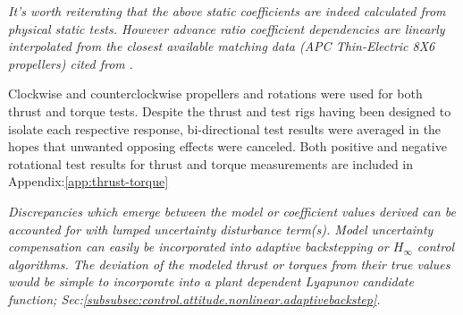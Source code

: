 \par
{\color{Gray}\emph{It's worth reiterating that the above static coefficients are indeed calculated from physical static tests. However advance ratio coefficient dependencies are linearly interpolated from the closest available matching data (APC Thin-Electric 8X6 propellers) cited from \cite{UIUC}}.}
\par
Clockwise and counterclockwise propellers and rotations were used for both thrust and torque tests. Despite the thrust and test rigs having been designed to isolate each respective response, bi-directional test results were averaged in the hopes that unwanted opposing effects were canceled. Both positive and negative rotational test results for thrust and torque measurements are included in Appendix:\ref{app:thrust-torque}
\par
{\color{Gray}\emph{Discrepancies which emerge between the model or coefficient values derived can be accounted for with lumped uncertainty disturbance term(s). Model uncertainty compensation can easily be incorporated into adaptive backstepping or $H_\infty$ control algorithms. The deviation of the modeled thrust or torques from their true values would be simple to incorporate into a plant dependent Lyapunov candidate function; Sec:\ref{subsubsec:control.attitude.nonlinear.adaptivebackstep}.}}
